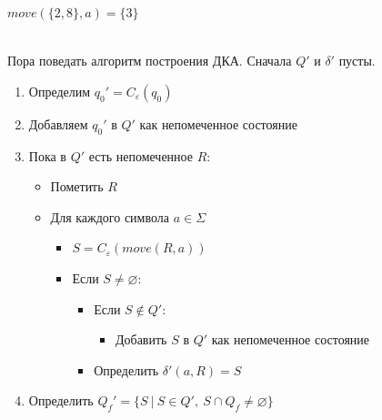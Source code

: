 \documentclass[11pt]{article}
\begin{document}
\begin{example}
    $move(\{2, 8\}, a) = \{3\}$
\end{example} \leavevmode
\\
Пора поведать алгоритм построения ДКА. Сначала $Q'$ и $\delta'$ пусты. 
\begin{enumerate}
    \item Определим $q_0' = C_{\varepsilon}(q_0)$
    \item Добавляем $q_0'$ в $Q'$ как непомеченное состояние
    \item Пока в $Q'$ есть непомеченное $R$:
    \begin{itemize}
        \item Пометить $R$
        \item Для каждого символа $a \in \Sigma$
        \begin{itemize}
            \item $S = C_{\varepsilon}(move(R, a))$
            \item Если $S \neq \varnothing$:
            \begin{itemize}
                \item Если $S \notin Q'$:
                \begin{itemize}
                    \item Добавить $S$ в $Q'$ как непомеченное состояние
                \end{itemize}
                \item Определить $\delta'(a, R) = S$
            \end{itemize}
        \end{itemize}
    \end{itemize}
    \item Определить $Q_f' = \{S \ | \ S \in Q', \ S \cap Q_f \neq \varnothing\}$ 
\end{enumerate} \leavevmode
\\
\end{document}
